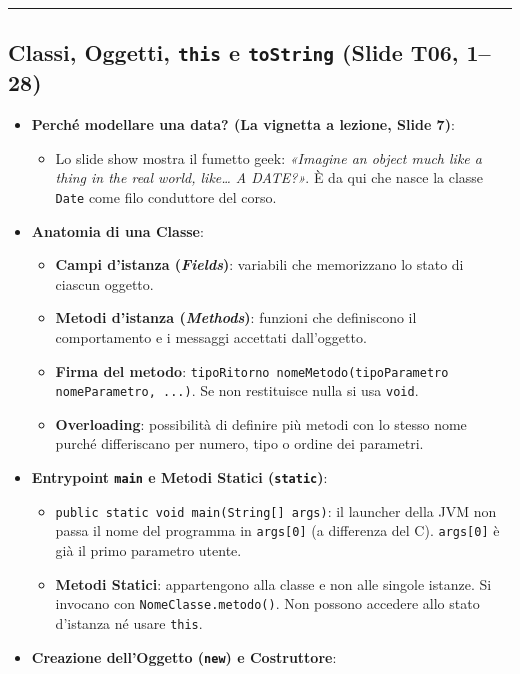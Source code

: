 \documentclass[11pt,a4paper,oneside]{report}
\newcommand{\passthrough}[1]{#1}
\providecommand{\tightlist}{\setlength{\itemsep}{0pt}\setlength{\parskip}{0pt}}
\begin{document}
\begin{center}\rule{0.5\linewidth}{0.5pt}\end{center}

\subsection{\texorpdfstring{Classi, Oggetti, \texttt{this} e
\texttt{toString} (Slide T06,
1--28)}{Classi, Oggetti, this e toString (Slide T06, 1--28)}}\label{chap05_classi-oggetti-this-e-tostring-slide-t06-128}

\begin{itemize}
\tightlist
\item
  \textbf{Perché modellare una data? (La vignetta a lezione, Slide 7)}:

  \begin{itemize}
  \tightlist
  \item
    Lo slide show mostra il fumetto geek: \emph{«Imagine an object much
    like a thing in the real world, like\ldots{} A DATE?»}. È da qui che
    nasce la classe \passthrough{\lstinline!Date!} come filo conduttore
    del corso.
  \end{itemize}
\item
  \textbf{Anatomia di una Classe}:

  \begin{itemize}
  \tightlist
  \item
    \textbf{Campi d'istanza (\emph{Fields})}: variabili che memorizzano
    lo stato di ciascun oggetto.
  \item
    \textbf{Metodi d'istanza (\emph{Methods})}: funzioni che definiscono
    il comportamento e i messaggi accettati dall'oggetto.
  \item
    \textbf{Firma del metodo}:
    \passthrough{\lstinline!tipoRitorno nomeMetodo(tipoParametro nomeParametro, ...)!}.
    Se non restituisce nulla si usa \passthrough{\lstinline!void!}.
  \item
    \textbf{Overloading}: possibilità di definire più metodi con lo
    stesso nome purché differiscano per numero, tipo o ordine dei
    parametri.
  \end{itemize}
\item
  \textbf{Entrypoint \passthrough{\lstinline!main!} e Metodi Statici
  (\passthrough{\lstinline!static!})}:

  \begin{itemize}
  \tightlist
  \item
    \passthrough{\lstinline!public static void main(String[] args)!}: il
    launcher della JVM non passa il nome del programma in
    \passthrough{\lstinline!args[0]!} (a differenza del C).
    \passthrough{\lstinline!args[0]!} è già il primo parametro utente.
  \item
    \textbf{Metodi Statici}: appartengono alla classe e non alle singole
    istanze. Si invocano con
    \passthrough{\lstinline!NomeClasse.metodo()!}. Non possono accedere
    allo stato d'istanza né usare \passthrough{\lstinline!this!}.
  \end{itemize}
\item
  \textbf{Creazione dell'Oggetto (\passthrough{\lstinline!new!}) e
  Costruttore}:


\end{itemize}
\end{document}
